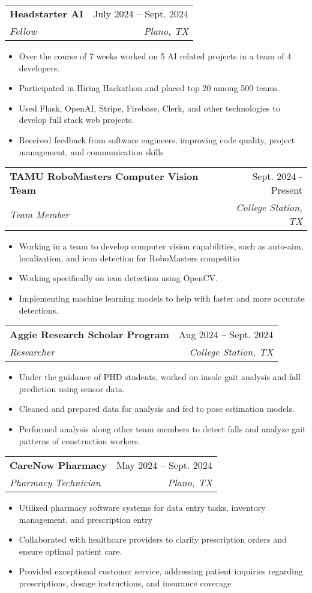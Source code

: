 \documentclass[letterpaper,11pt]{article}
\makeatletter
\newcommand{\resumeItem}[1]{
  \item\small{
    {#1 \vspace{-2pt}}
  }
}
\newcommand{\resumeSubheading}[4]{
  \vspace{-2pt}\item
    \begin{tabular*}{0.97\textwidth}[t]{l@{\extracolsep{\fill}}r}
      \textbf{#1} & #2 \\
      \textit{\small#3} & \textit{\small #4} \\
    \end{tabular*}\vspace{-7pt}
}
\newcommand{\resumeSubSubheading}[2]{
    \item
    \begin{tabular*}{0.97\textwidth}{l@{\extracolsep{\fill}}r}
      \textit{\small#1} & \textit{\small #2} \\
    \end{tabular*}\vspace{-7pt}
}
\newcommand{\resumeSubHeadingListEnd}{\end{itemize}}
\newcommand{\resumeItemListStart}{\begin{itemize}}
\newcommand{\resumeItemListEnd}{\end{itemize}\vspace{-5pt}}
\makeatother
\begin{document}
    \resumeSubheading
      {Headstarter AI}{July 2024 -- Sept. 2024}
      {Fellow}{Plano, TX}
      \resumeItemListStart
        \resumeItem{Over the course of 7 weeks worked on 5 AI related projects in a team of 4 developers.}
        \resumeItem{Participated in Hiring Hackathon and placed top 20 among 500 teams.}
        \resumeItem{Used Flask, OpenAI, Stripe, Firebase, Clerk, and other technologies to develop full stack web projects.}
        \resumeItem{Received feedback from software engineers, improving code quality, project management, and communication skills}
      \resumeItemListEnd

      \resumeSubheading
      {TAMU RoboMasters Computer Vision Team}{Sept. 2024 - Present}
      {Team Member}{College Station, TX}
      \resumeItemListStart
        \resumeItem{Working in a team to develop computer vision capabilities, such as auto-aim, localization, and icon detection for RoboMasters competitio}
        \resumeItem{Working specifically on icon detection using OpenCV.}
        \resumeItem{Implementing machine learning models to help with faster and more accurate detections.}
      \resumeItemListEnd

      \resumeSubheading
      {Aggie Research Scholar Program}{Aug 2024 -- Sept. 2024}
      {Researcher}{College Station, TX}
      \resumeItemListStart
        \resumeItem{Under the guidance of PHD students, worked on insole gait analysis and fall prediction using sensor data.}
        \resumeItem{Cleaned and prepared data for analysis and fed to pose estimation models.}
        \resumeItem{Performed analysis along other team members to detect falls and analyze gait patterns of construction workers.}
      \resumeItemListEnd

      \resumeSubheading
      {CareNow Pharmacy}{May 2024 -- Sept. 2024}
      {Pharmacy Technician}{Plano, TX}
      \resumeItemListStart
        \resumeItem{Utilized pharmacy software systems for data entry tasks, inventory management, and prescription entry}
        \resumeItem{Collaborated with healthcare providers to clarify prescription orders and ensure optimal patient care.}
        \resumeItem{Provided exceptional customer service, addressing patient inquiries regarding prescriptions, dosage instructions, and insurance coverage}
      \resumeItemListEnd
      
\end{document}
